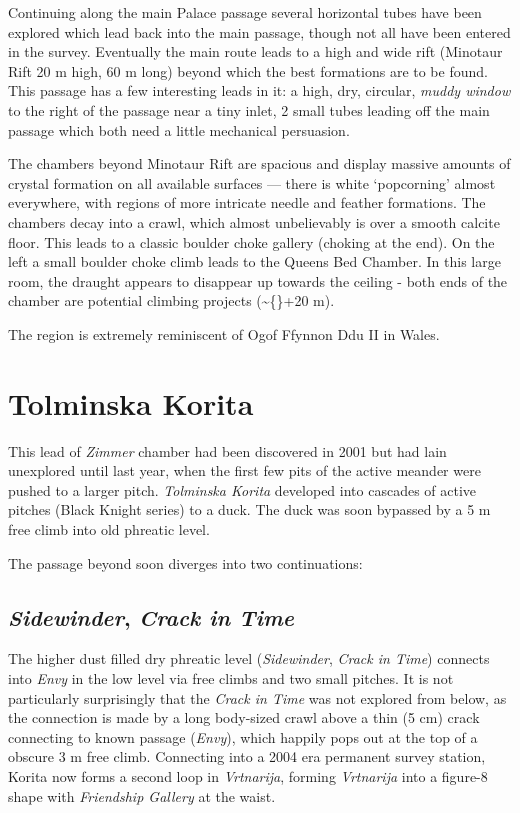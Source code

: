 Continuing along the main Palace passage several horizontal tubes have
been explored which lead back into the main passage, though not all have
been entered in the survey. Eventually the main route leads to a high
and wide rift (Minotaur Rift \textemdash{} 20 m high, 60 m long) beyond
which the best formations are to be found. This passage has a few
interesting leads in it: a high, dry, circular, \emph{muddy window} to
the right of the passage near a tiny inlet, 2 small tubes leading off
the main passage which both need a little mechanical persuasion.

The chambers beyond Minotaur Rift are spacious and display massive
amounts of crystal formation on all available surfaces --- there is
white `popcorning' almost everywhere, with regions of more intricate
needle and feather formations. The chambers decay into a crawl, which
almost unbelievably is over a smooth calcite floor. This leads to a
classic boulder choke gallery (choking at the end). On the left a small
boulder choke climb leads to the Queens Bed Chamber. In this large room,
the draught appears to disappear up towards the ceiling - both ends of
the chamber are potential climbing projects (\textasciitilde\{\}+20 m).

The region is extremely reminiscent of Ogof Ffynnon Ddu II in Wales.


\section{Tolminska Korita}

This lead of \emph{Zimmer} chamber had been discovered in 2001 but had
lain unexplored until last year, when the first few pits of the active
meander were pushed to a larger pitch. \emph{Tolminska Korita} developed
into cascades of active pitches (Black Knight series) to a duck. The
duck was soon bypassed by a 5 m free climb into old phreatic level.

The passage beyond soon diverges into two continuations:


\subsection{\texorpdfstring{\emph{Sidewinder}, \emph{Crack in
Time}}{Sidewinder, Crack in Time}}

The higher dust filled dry phreatic level (\emph{Sidewinder},
\emph{Crack in Time}) connects into \emph{Envy} in the low level via
free climbs and two small pitches. It is not particularly surprisingly
that the \emph{Crack in Time} was not explored from below, as the
connection is made by a long body-sized crawl above a thin (5 cm) crack
connecting to known passage (\emph{Envy}), which happily pops out at the
top of a obscure 3 m free climb. Connecting into a 2004 era permanent
survey station, Korita now forms a second loop in \emph{Vrtnarija},
forming \emph{Vrtnarija} into a figure-8 shape with \emph{Friendship
Gallery} at the waist.

